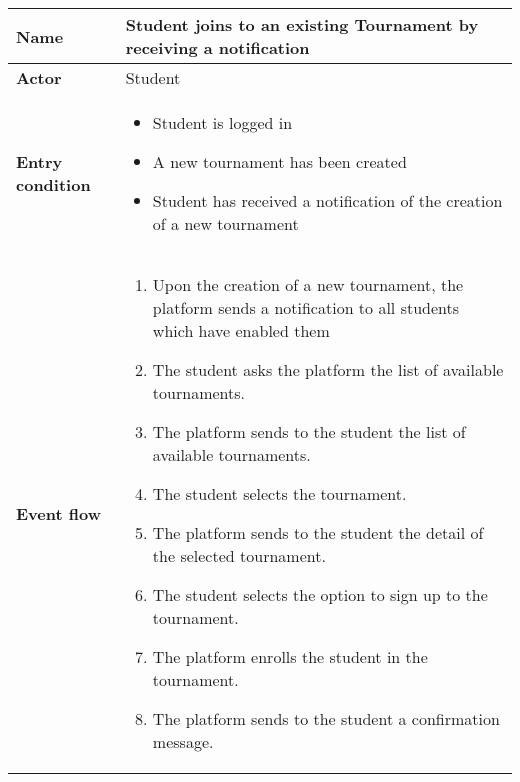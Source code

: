 \begin{enumerate}[label=\textbf{UC\arabic*}:,ref=UC\arabic*,leftmargin=1.3cm]
{\begin{table}[H]
                  \centering
                  \begin{tabular}{|l|p{11.9cm}|}
                        \hline
                        \textbf{Name}            & Student joins to an existing Tournament by receiving a notification                                     \\\hline
                        \textbf{Actor}           & Student                                                                                                 \\\hline
                        \textbf{Entry condition} &
                        \begin{itemize}
                              \item Student is logged in
                              \item A new tournament has been created
                              \item Student has received a notification of the creation of a new tournament
                        \end{itemize}                                                       \\\hline
                        \textbf{Event flow}      &
                        \begin{enumerate}[label=\arabic*.]
                              \item Upon the creation of a new tournament, the platform sends a notification to all students which have enabled them
                              \item The student asks the platform the list of available tournaments.
                              \item The platform sends to the student the list of available tournaments.
                              \item The student selects the tournament.
                              \item The platform sends to the student the detail of the selected tournament.
                              \item The student selects the option to sign up to the tournament.
                              \item The platform enrolls the student in the tournament.
                              \item The platform sends to the student a confirmation message.
                        \end{enumerate}              \\\hline

\end{tabular}
\end{table}}
\end{enumerate}
